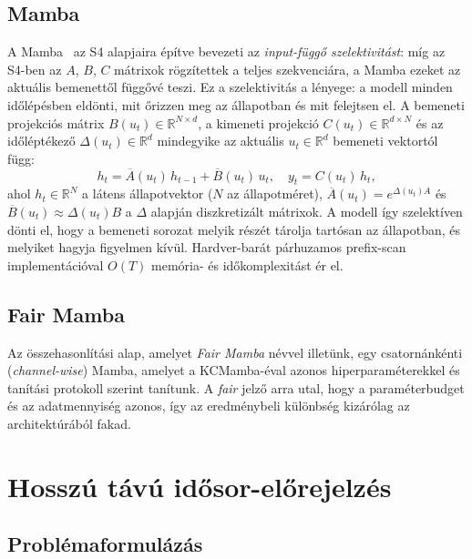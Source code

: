 \subsection{Mamba}

A Mamba~\cite{gu2023mamba} az S4 alapjaira építve bevezeti az
\emph{input-függő szelektivitást}: míg az S4-ben az $A$, $B$, $C$
mátrixok rögzítettek a teljes szekvenciára, a Mamba ezeket az aktuális
bemenettől függővé teszi. Ez a szelektivitás a lényege: a modell
minden időlépésben eldönti, mit őrizzen meg az állapotban és mit
felejtsen el. A bemeneti projekciós mátrix
$B(u_t) \in \mathbb{R}^{N \times d}$, a kimeneti projekció
$C(u_t) \in \mathbb{R}^{d \times N}$ és az időléptékező
$\Delta(u_t) \in \mathbb{R}^d$ mindegyike az aktuális
$u_t \in \mathbb{R}^d$ bemeneti vektortól függ:
\begin{equation}
    h_t = \overline{A}(u_t)\, h_{t-1} + \overline{B}(u_t)\, u_t,
    \quad y_t = C(u_t)\, h_t,
    \label{eq:mamba_recurrence}
\end{equation}
ahol $h_t \in \mathbb{R}^N$ a látens állapotvektor ($N$ az állapotméret),
$\overline{A}(u_t) = e^{\Delta(u_t) A}$ és
$\overline{B}(u_t) \approx \Delta(u_t) B$ a $\Delta$ alapján diszkretizált
mátrixok.
A modell így szelektíven dönti el, hogy a bemeneti sorozat melyik részét
tárolja tartósan az állapotban, és melyiket hagyja figyelmen kívül.
Hardver-barát párhuzamos prefix-scan implementációval $O(T)$ memória- és
időkomplexitást ér el.

\subsection{Fair Mamba}

Az összehasonlítási alap, amelyet \emph{Fair Mamba} névvel illetünk,
egy csatornánkénti (\emph{channel-wise}) Mamba, amelyet a KCMamba-éval
azonos hiperparaméterekkel és tanítási protokoll szerint tanítunk.
A \emph{fair} jelző arra utal, hogy a paraméterbudget és az adatmennyiség
azonos, így az eredménybeli különbség kizárólag az architektúrából fakad.

\section{Hosszú távú idősor-előrejelzés}
\label{sec:ltsf}

\subsection{Problémaformulázás}

